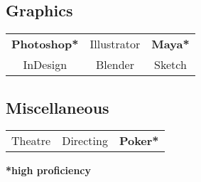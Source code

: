 \documentclass[letterpaper]{deedy-resume} %
\begin{document}
\begin{minipage}[t]{0.33\textwidth}
  \vspace{4mm}

  \subsection{Graphics}

  \begin{tabular}{ c c c }
    \textbf{Photoshop*} & Illustrator & \textbf{Maya*} \\
    InDesign & Blender & Sketch
  \end{tabular}

  \vspace{4mm}

  \subsection{Miscellaneous}

  \begin{tabular}{ c c c }
    Theatre & Directing & \textbf{Poker*}
  \end{tabular}

  \vspace{3mm}
  \textbf{*high proficiency}
  
  \sectionspace %



%
%


\end{minipage} %
\hfill
%
%
\end{document}
